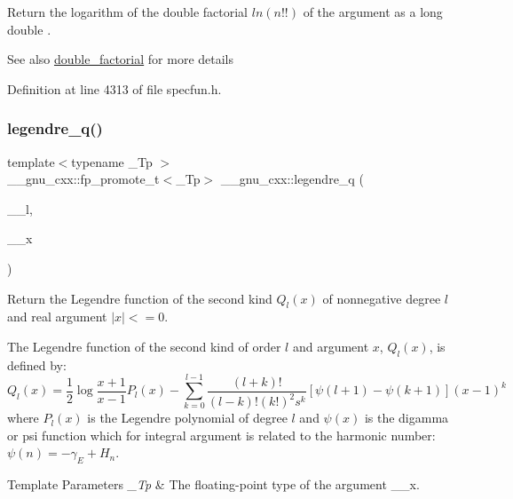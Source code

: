 Return the logarithm of the double factorial $ ln(n!!) $ of the argument as a {\ttfamily  long double }.

\begin{DoxySeeAlso}{See also}
\hyperlink{group__gnu__math__spec__func_ga1e62c47f84f9782828f8830b4fedc13c}{double\+\_\+factorial} for more details 
\end{DoxySeeAlso}


Definition at line 4313 of file specfun.\+h.

\mbox{\label{group__gnu__math__spec__func_gadad5b22d0075dca31690907668af568f}} 
\subsubsection{\texorpdfstring{legendre\+\_\+q()}{legendre\_q()}}
{\footnotesize\ttfamily template$<$typename \+\_\+\+Tp $>$ \\
\+\_\+\+\_\+gnu\+\_\+cxx\+::fp\+\_\+promote\+\_\+t$<$\+\_\+\+Tp$>$ \+\_\+\+\_\+gnu\+\_\+cxx\+::legendre\+\_\+q (\begin{DoxyParamCaption}\item[{unsigned int}]{\+\_\+\+\_\+l,  }\item[{\+\_\+\+Tp}]{\+\_\+\+\_\+x }\end{DoxyParamCaption})\hspace{0.3cm}{\ttfamily [inline]}}

Return the Legendre function of the second kind $ Q_l(x) $ of nonnegative degree $ l $ and real argument $ |x| <= 0 $.

The Legendre function of the second kind of order $ l $ and argument $ x $, $ Q_l(x) $, is defined by\+: \[ Q_l(x) = \frac{1}{2} \log{\frac{x+1}{x-1}} P_l(x) - \sum_{k=0}^{l-1}\frac{(l+k)!}{(l-k)!(k!)^2 s^k} \left[\psi(l+1) - \psi(k+1)\right](x-1)^k \] where $ P_l(x) $ is the Legendre polynomial of degree $ l $ and $ \psi(x) $ is the digamma or psi function which for integral argument is related to the harmonic number\+: $ \psi(n) = -\gamma_E + H_n $.


\begin{DoxyTemplParams}{Template Parameters}
{\em \+\_\+\+Tp} & The floating-\/point type of the argument {\ttfamily \+\_\+\+\_\+x}. \\
\hline
\end{DoxyTemplParams}

